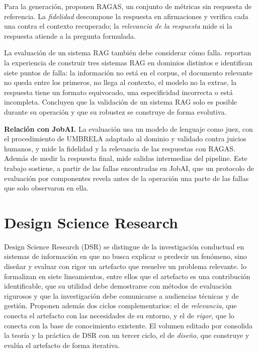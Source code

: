 Para la generación, \citet{Es2024} proponen RAGAS, un conjunto de métricas sin respuesta de referencia. La \emph{fidelidad} descompone la respuesta en afirmaciones y verifica cada una contra el contexto recuperado; la \emph{relevancia de la respuesta} mide si la respuesta atiende a la pregunta formulada.

La evaluación de un sistema RAG también debe considerar cómo falla. \citet{Barnett2024} reportan la experiencia de construir tres sistemas RAG en dominios distintos e identifican siete puntos de falla: la información no está en el corpus, el documento relevante no queda entre los primeros, no llega al contexto, el modelo no la extrae, la respuesta tiene un formato equivocado, una especificidad incorrecta o está incompleta. Concluyen que la validación de un sistema RAG solo es posible durante su operación y que su robustez se construye de forma evolutiva.

\textbf{Relación con JobAI.} La evaluación usa un modelo de lenguaje como juez, con el procedimiento de UMBRELA adaptado al dominio y validado contra juicios humanos, y mide la fidelidad y la relevancia de las respuestas con RAGAS. Además de medir la respuesta final, mide salidas intermedias del pipeline. Este trabajo sostiene, a partir de las fallas encontradas en JobAI, que un protocolo de evaluación por componentes revela antes de la operación una parte de las fallas que \citet{Barnett2024} solo observaron en ella.

\section{Design Science Research}
\label{sec:estado-arte-dsr}

Design Science Research (DSR) se distingue de la investigación conductual en sistemas de información en que no busca explicar o predecir un fenómeno, sino diseñar y evaluar con rigor un artefacto que resuelve un problema relevante. \citet{Hevner2004} lo formalizan en siete lineamientos, entre ellos que el artefacto es una contribución identificable, que su utilidad debe demostrarse con métodos de evaluación rigurosos y que la investigación debe comunicarse a audiencias técnicas y de gestión. Proponen además dos ciclos complementarios: el de \emph{relevancia}, que conecta el artefacto con las necesidades de su entorno, y el de \emph{rigor}, que lo conecta con la base de conocimiento existente. El volumen editado por \citet{HevnerChatterjee2010} consolida la teoría y la práctica de DSR con un tercer ciclo, el de \emph{diseño}, que construye y evalúa el artefacto de forma iterativa.

